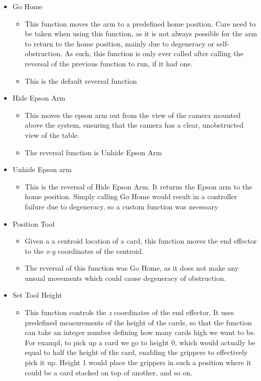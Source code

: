 \begin{itemize}
	
	\item Go Home
		\begin{itemize}
		\item This function moves the arm to a predefined home position. Care need to be taken when using this function, as it is not always possible for the arm to return to the home position, mainly due to degeneracy or self-obstruction. As such, this function is only ever called after calling the reversal of the previous function to run, if it had one.
		\item This is the default reversal function
		\end{itemize}
	\item Hide Epson Arm
		\begin{itemize}
		\item This moves the epson arm out from the view of the camera mounted above the system, ensuring that the camera has a clear, unobstructed view of the table. 
		\item The reversal function is Unhide Epson Arm
		\end{itemize}
	\item Unhide Epson arm
		\begin{itemize}
		\item This is the reversal of Hide Epson Arm. It returns the Epson arm to the home position. Simply calling Go Home would result in a controller failure due to degeneracy, so a custom function was necessary
		\end{itemize}
	\item Position Tool
		\begin{itemize}
		\item Given a a centroid location of a card, this function moves the end effector to the \textit{x-y} coordinates of the centroid.
		\item The reversal of this function was Go Home, as it does not make any unsual movements which could cause degeneracy of obstruction.
		\end{itemize}
	\item Set Tool Height
		\begin{itemize}
		\item This function controls the \textit{z} coordinates of the end effector. It uses predefined measurements of the height of the cards, so that the function can take an integer number defining how many cards high we want to be. For exampl, to pick up a card we go to height 0, which would actually be equal to half the height of the card, enabling the grippers to effectively pick it up. Height 1 would place the grippers in such a position where it could be a card stacked on top of another, and so on.

\end{itemize}
\end{itemize}
